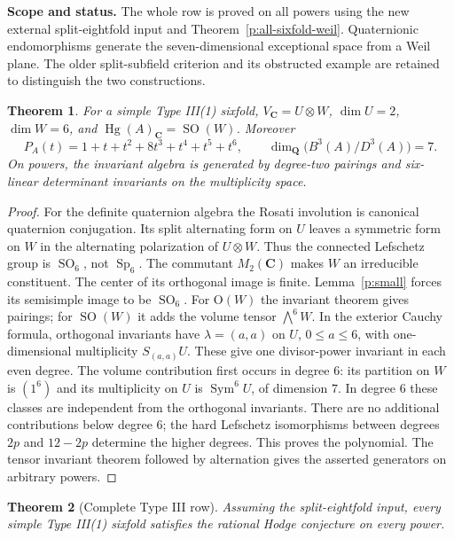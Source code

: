 \documentclass[10pt,reqno]{article}
\theoremstyle{emphasizedplain}
\newtheorem{theorem}{Theorem}[section]
\theoremstyle{emphasizeddefinition}
\theoremstyle{emphasizeddefinition}
\DeclareMathOperator{\Hg}{Hg}
\DeclareMathOperator{\Sp}{Sp}
\DeclareMathOperator{\SO}{SO}
\DeclareMathOperator{\Sym}{Sym}
\newcommand{\Q}{\mathbf Q}
\newcommand{\C}{\mathbf C}
\newcommand{\B}{B}
\newcommand{\D}{D}
\newcommand{\status}[1]{%
  \par\nobreak\smallskip\noindent
  {\setlength{\fboxsep}{7pt}%
   \colorbox{ScopeBackground}{%
    \parbox{\dimexpr\linewidth-2\fboxsep\relax}{%
     \small\textbf{\textcolor{HeadingInk}{Scope and status.}} #1}}}%
  \par\nobreak\medskip}
\renewcommand{\small}{\fontsize{8.4}{10}\selectfont}
\begin{document}
\status{The whole row is proved on all powers using the new external
split-eightfold input and Theorem~\ref{p:all-sixfold-weil}.
Quaternionic endomorphisms generate the seven-dimensional exceptional
space from a Weil plane. The older split-subfield criterion and its
obstructed example are retained to distinguish the two constructions.}
\begin{theorem}\label{t:S7structure}
For a simple Type III(1) sixfold,
$V_\C=U\otimes W$, $\dim U=2$, $\dim W=6$, and
$\Hg(A)_\C=\SO(W)$. Moreover
\[
 P_A(t)=1+t+t^2+8t^3+t^4+t^5+t^6,
 \qquad\dim_\Q\bigl(\B^3(A)/\D^3(A)\bigr)=7.
\]
On powers, the invariant algebra is generated by degree-two pairings and
six-linear determinant invariants on the multiplicity space.
\end{theorem}
\begin{proof}
For the definite quaternion algebra the Rosati involution is canonical
quaternion conjugation. Its split alternating form on $U$ leaves a
symmetric form on $W$ in the alternating polarization of $U\otimes W$.
Thus the connected Lefschetz group is $\SO_6$, not $\Sp_6$.
The commutant $M_2(\C)$ makes $W$ an irreducible constituent.
The center of its orthogonal image is finite.
Lemma~\ref{p:small} forces its semisimple image to be $\SO_6$.
For $\mathrm O(W)$ the invariant theorem gives pairings; for $\SO(W)$ it
adds the volume tensor $\bigwedge^6 W$.
In the exterior Cauchy formula, orthogonal invariants have
$\lambda=(a,a)$ on $U$, $0\leq a\leq6$, with one-dimensional multiplicity
$S_{(a,a)}U$. These give one divisor-power invariant in each even degree.
The volume contribution first occurs in degree $6$: its partition on $W$
is $(1^6)$ and its multiplicity on $U$ is $\Sym^6 U$, of dimension $7$.
In degree $6$ these classes are independent from the orthogonal invariants.
There are no additional contributions below degree $6$; the hard Lefschetz
isomorphisms between degrees $2p$ and $12-2p$ determine the higher degrees.
This proves the polynomial. The tensor invariant theorem followed by
alternation gives the asserted generators on arbitrary powers.
\end{proof}
\begin{theorem}[Complete Type III row]\label{t:S7complete}
Assuming the split-eightfold input, every simple Type III(1) sixfold
satisfies the rational Hodge conjecture on every power.
\end{theorem}
\end{document}
